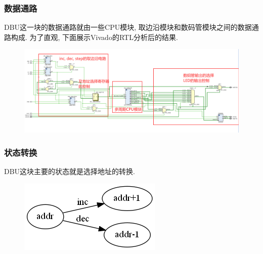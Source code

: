 \documentclass[UTF8]{article}
\begin{document}
\subsubsection{数据通路}
DBU这一块的数据通路就由一些CPU模块, 取边沿模块和数码管模块之间的数据通路构成. 为了直观, 下面展示Vivado的RTL分析后的结果.\par
\begin{figure}[H]
	\centering
	\includegraphics[width=\linewidth]{dbu_data_path.png}
\end{figure}
\subsubsection{状态转换}
DBU这块主要的状态就是选择地址的转换.
\begin{figure}[H]
	\centering
	\includegraphics[width=\linewidth/5]{dbu_phase_diagram.png}
\end{figure}
\end{document}
